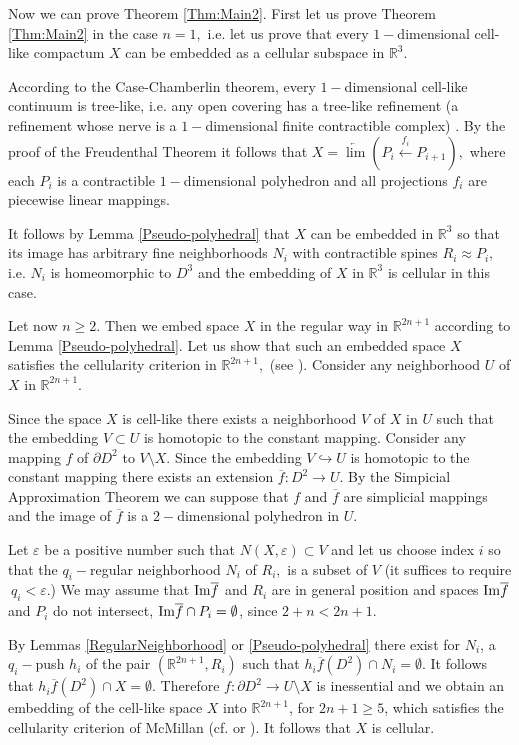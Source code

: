 Now we can prove 
Theorem \ref{Thm:Main2}. First let us prove Theorem
\ref{Thm:Main2} in the case $n = 1,$ i.e. let us prove that every
$1-$dimensional cell-like compactum $X$ can be embedded as a
cellular subspace in $\mathbb{R}^3.$ 

According to the
Case-Chamberlin theorem, every $1-$dimensional cell-like continuum
is tree-like, i.e. any open covering has a tree-like refinement (a
refinement whose
nerve is
a $1-$dimensional finite
contractible complex)
\cite{CC}. By the proof of the Freudenthal
Theorem \cite{S} it follows that $X =
\underleftarrow{\lim}(P_i\stackrel{f_i}\longleftarrow P_{i+1}),$
where each $P_i$ is a contractible $1-$dimensional polyhedron and
all projections $f_i$ are piecewise linear mappings. 

It follows
by Lemma
\ref{Pseudo-polyhedral}  that $X$ can be embedded in
$\mathbb{R}^3$ so that its image has arbitrary fine neighborhoods
$N_i$ with contractible spines $R_i \approx P_i,$ i.e. $N_i$ is
homeomorphic to $D^3$ and the embedding of $X$ in $\mathbb{R}^3$
is cellular
in this case.

Let now $n \geq 2.$ Then we embed space $X$ in the regular way
in $\mathbb{R}^{2n+1}$ according to  Lemma
\ref{Pseudo-polyhedral}. Let us show that such
an
embedded space $X$
satisfies the cellularity criterion in $\mathbb{R}^{2n+1},$ (see
\cite{DV}). Consider any neighborhood $U$ of 
$X$ in
$\mathbb{R}^{2n+1}.$ 

Since the space $X$ is cell-like there exists
a neighborhood $V$ of $X$ in $U$ such that the embedding $V
\subset U$ is homotopic to the constant mapping. Consider any
mapping $f$ of $\partial D^2$ to $V\setminus X.$ Since the
embedding $V \hookrightarrow U$ is homotopic to the constant
mapping there exists an extension  $\overline{f}: D^2 \to U.$ By
the Simpicial Approximation Theorem we can suppose that $f$ and
$\overline{f}$ are simplicial mappings and the image of
$\overline{f}$ is a $2-$dimensional polyhedron in $U.$ 

Let
$\varepsilon$ be a
positive number such that $N(X,
\varepsilon)\subset V$ and let us choose 
index $i$ so that the
$q_i-$regular neighborhood $N_{i}$ of $R_{i},$  is a subset of $V$
(it suffices to require $\ q_i < \varepsilon.$) We may assume
that
${\rm Im} \overline{f}$ and $R_{i}$ are in general position and
spaces ${\rm Im}\overline{f}$ and $P_i$ do not intersect, ${\rm
Im}\overline{f} \cap P_i = \emptyset$, since $2+n < 2n+1.$ 

By Lemmas \ref{RegularNeighborhood} or
\ref{Pseudo-polyhedral} there exist
for
$N_{i}$, a $q_i-$push $h_{i}$ of the pair
$(\mathbb{R}^{2n+1}, R_{i})$ such that $h_{i}\overline{f}(D^2)\cap
N_{i} = \emptyset.$ It follows that $h_{i}\overline{f}(D^2)\cap X
= \emptyset.$ Therefore $f:\partial D^2\to U\setminus X$ is
inessential and we obtain
an embedding of the
cell-like space $X$ into
$\mathbb{R}^{2n+1}$, for $2n+1\geq 5$, which satisfies the
cellularity criterion of McMillan (cf. \cite{McM} or \cite[Theorem
3.2.3]{DV}). It follows that $X$ is cellular.

